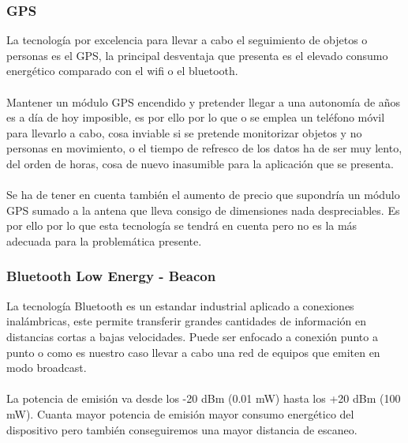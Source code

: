\documentclass[a4paper ,12pt, onecolumn]{article}
\begin{document}
        \subsubsection {GPS}
            La tecnología por excelencia para llevar a cabo el seguimiento de objetos o personas es el GPS, la principal desventaja
            que presenta es el elevado consumo energético comparado con el wifi o el bluetooth.
            \paragraph{}
            Mantener un módulo GPS encendido y pretender llegar a una autonomía de años es a día de hoy
            imposible, es por ello por lo que o se emplea un teléfono móvil para llevarlo a cabo, cosa inviable si se pretende 
            monitorizar objetos  y no personas en movimiento, o el tiempo de refresco de los datos ha de ser muy lento, del orden de horas,
            cosa de nuevo inasumible para la aplicación que se presenta.
            \paragraph{}
            Se ha de tener en cuenta también el aumento de precio que supondría un módulo GPS sumado a la antena que lleva consigo de 
            dimensiones nada despreciables. 
            Es por ello por lo que esta tecnología se tendrá en cuenta pero no es la más adecuada para la problemática presente.
        \subsubsection {Bluetooth Low Energy - Beacon}
            La tecnología Bluetooth es un estandar industrial aplicado a conexiones inalámbricas, este permite transferir 
            grandes cantidades de información en distancias cortas a bajas velocidades. Puede ser enfocado a conexión
            punto a punto o como es nuestro caso llevar a cabo una red de equipos que emiten en modo broadcast.
            \paragraph{}
            La potencia de emisión va desde los -20 dBm (0.01 mW) hasta los +20 dBm (100 mW). Cuanta mayor potencia de emisión mayor consumo energético
            del dispositivo pero también conseguiremos una mayor distancia de escaneo.
\end{document}
